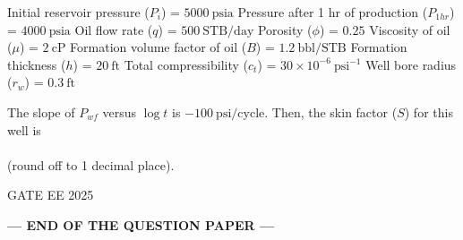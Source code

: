 \documentclass{article}
\begin{document}
\begin{enumerate}[leftmargin=*,series=q]
Initial reservoir pressure ($P_{i}$) = $5000 \ \text{psia}$  
Pressure after 1 hr of production ($P_{1hr}$) = $4000 \ \text{psia}$  
Oil flow rate ($q$) = $500 \ \text{STB/day}$  
Porosity ($\phi$) = $0.25$  
Viscosity of oil ($\mu$) = $2 \ \text{cP}$  
Formation volume factor of oil ($B$) = $1.2 \ \text{bbl/STB}$  
Formation thickness ($h$) = $20 \ \text{ft}$  
Total compressibility ($c_{t}$) = $30 \times 10^{-6} \ \text{psi}^{-1}$  
Well bore radius ($r_{w}$) = $0.3 \ \text{ft}$  

The slope of $P_{wf}$ versus $\log t$ is $-100 \ \text{psi/cycle}$. Then, the skin factor ($S$) for this well is \\\\ (round off to 1 decimal place).  

GATE EE 2025
\end{enumerate}
\vspace{0.5cm}
\begin{center}
\textbf{\large --- END OF THE QUESTION PAPER ---}
\end{center}
\end{document}
